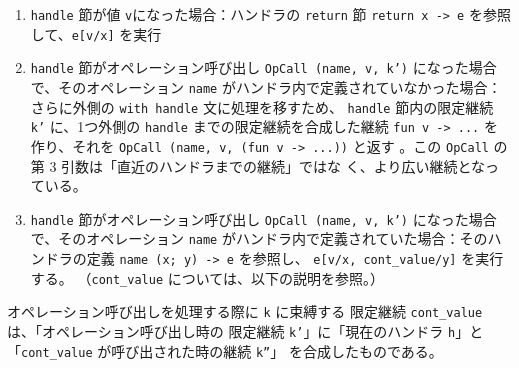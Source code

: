 \begin{enumerate}
\item \texttt{handle} 節が値 \texttt{v}になった場合：ハンドラの \texttt{return} 節 \texttt{return x -> e} を参照して、\texttt{e[v/x]} を実行
\item \texttt{handle} 節がオペレーション呼び出し \texttt{OpCall (name, v, k')} になった場合で、そのオペレーション \texttt{name} がハンドラ内で定義されていなかった場合：
さらに外側の \texttt{with handle} 文に処理を移すため、
\texttt{handle} 節内の限定継続 \texttt{k'} に、1つ外側の \texttt{handle} までの限定継続を合成した継続 \texttt{fun v -> ...} を作り、それを \texttt{OpCall (name, v, (fun v -> ...))} と返す
。この \texttt{OpCall} の第 3 引数は「直近のハンドラまでの継続」ではな
く、より広い継続となっている。
\item \texttt{handle} 節がオペレーション呼び出し \texttt{OpCall (name, v, k')} になった場合で、そのオペレーション \texttt{name} がハンドラ内で定義されていた場合：そのハンドラの定義 \texttt{name (x; y) -> e} を参照し、
\texttt{e[v/x, cont\_value/y]} を実行する。
（\texttt{cont\_value} については、以下の説明を参照。）
\end{enumerate}

オペレーション呼び出しを処理する際に \texttt{k} に束縛する
限定継続 \texttt{cont\_value} は、「オペレーション呼び出し時の
限定継続 \texttt{k'}」に「現在のハンドラ \texttt{h}」と
「\texttt{cont\_value} が呼び出された時の継続 \texttt{k''}」
を合成したものである。

